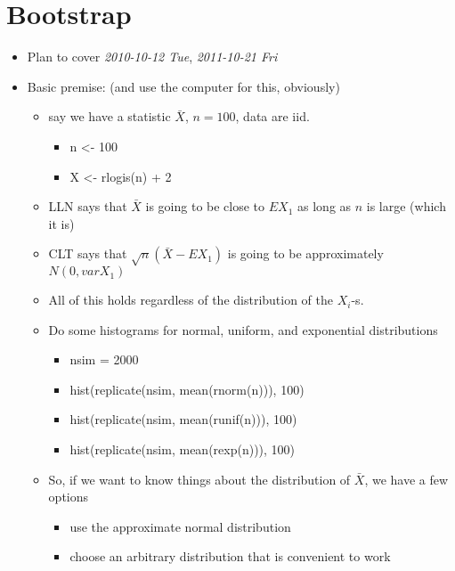 
\chapter{Bootstrap}

\begin{itemize}
\item Plan to cover \textit{2010-10-12 Tue}, \textit{2011-10-21 Fri}
\item Basic premise: (and use the computer for this, obviously)
\begin{itemize}
\item say we have a statistic $\bar X$, $n = 100$, data are iid.
\begin{itemize}
\item n <- 100
\item X <- rlogis(n) + 2
\end{itemize}
\item LLN says that $\bar X$ is going to be close to $E X_1$ as long
       as $n$ is large (which it is)
\item CLT says that $\sqrt{n} (\bar X - E X_1)$ is going to be
       approximately $N(0, var X_1)$
\item All of this holds regardless of the distribution of the
       $X_i$-s.
\item Do some histograms for normal, uniform, and exponential distributions
\begin{itemize}
\item nsim = 2000
\item hist(replicate(nsim, mean(rnorm(n))), 100)
\item hist(replicate(nsim, mean(runif(n))), 100)
\item hist(replicate(nsim, mean(rexp(n))), 100)
\end{itemize}
\item So, if we want to know things about the distribution of $\bar
       X$, we have a few options
\begin{itemize}
\item use the approximate normal distribution
\item choose an arbitrary distribution that is convenient to work

\end{itemize}
\end{itemize}
\end{itemize}
